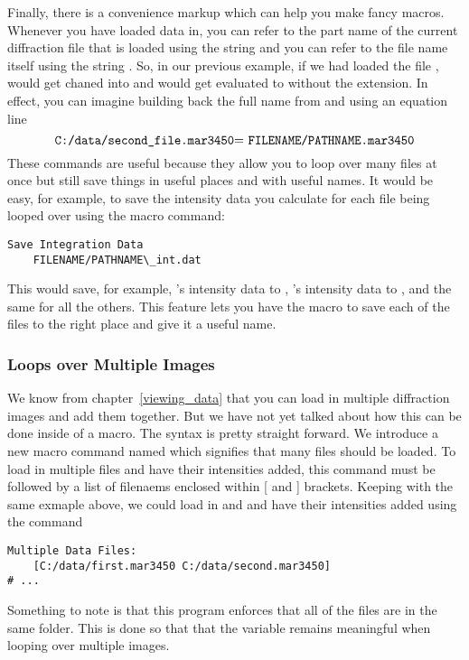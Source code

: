 Finally, there is a convenience markup which can help
you make fancy macros. Whenever you have loaded data 
in, you can refer to the part name of the current
diffraction file that is loaded using the string
 and you can refer to the file
name itself using the string . 
So, in our previous example, if we had loaded the
file ,
 would get chaned into 
 and  would
get evaluated to  without
the extension. In effect, you can imagine building 
back the full name from  and
 using an equation line
\begin{equation*}
    \text{{\ttfamily C:/data/second\_file.mar3450}=
    {\ttfamily FILENAME/PATHNAME.mar3450}}
\end{equation*}
These commands are useful because they allow you to
loop over many files at once but still save things 
in useful places and with useful names. It would be
easy, for example, to save the intensity data you
calculate for each file being looped over using the 
macro command:
\begin{lstlisting}[caption={'Using the FILENAME and PATHNAME Markup'}]
Save Integration Data
    FILENAME/PATHNAME\_int.dat
\end{lstlisting}
This would save, for example, 
's intensity data to
,
's intensity data 
to , and the
same for all the others. This feature lets you have
the macro to save each of the files to the right place
and give it a useful name.

\subsubsection{Loops over Multiple Images}

We know from chapter~\ref{viewing_data} that
you can load in multiple diffraction images and add them
together. But we have not yet talked about how this can
be done inside of a macro. The syntax is pretty straight
forward. We introduce a new macro command named
 which signifies that
many files should be loaded. To load in multiple files
and have their intensities added, this command must be 
followed by a list of filenaems enclosed within
[ and ] brackets. Keeping with the same exmaple above,
we could load in  and
 and have their
intensities added using the command
\begin{lstlisting}[caption={'Add the intensities'}]
Multiple Data Files:
    [C:/data/first.mar3450 C:/data/second.mar3450]
# ...
\end{lstlisting}
Something to note is that this program enforces that
all of the files are in the same folder. This is done
so that that the  variable remains 
meaningful when looping over multiple images.

